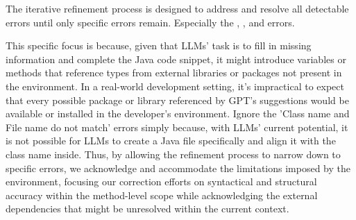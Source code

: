 

The iterative refinement process is designed to address and resolve all detectable errors until only specific errors remain. Especially the , , and  errors.

This specific focus is because, given that LLMs' task is to fill in missing information and complete the Java code snippet, it might introduce variables or methods that reference types from external libraries or packages not present in the environment. In a real-world development setting, it's impractical to expect that every possible package or library referenced by GPT's suggestions would be available or installed in the developer's environment. Ignore the 'Class name and File name do not match' errors simply because, with LLMs' current potential, it is not possible for LLMs to create a Java file specifically and align it with the class name inside. Thus, by allowing the refinement process to narrow down to specific errors, we acknowledge and accommodate the limitations imposed by the environment, focusing our correction efforts on syntactical and structural accuracy within the method-level scope while acknowledging the external dependencies that might be unresolved within the current context.



